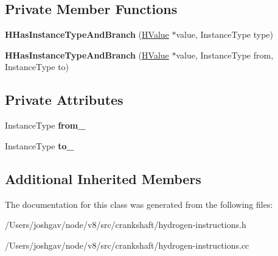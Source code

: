 \subsection*{Private Member Functions}
\begin{DoxyCompactItemize}
\item 
{\bfseries H\+Has\+Instance\+Type\+And\+Branch} (\hyperlink{classv8_1_1internal_1_1_h_value}{H\+Value} $\ast$value, Instance\+Type type)\hypertarget{classv8_1_1internal_1_1_h_has_instance_type_and_branch_a60d3746138690be31f950fab2bf1f64b}{}\label{classv8_1_1internal_1_1_h_has_instance_type_and_branch_a60d3746138690be31f950fab2bf1f64b}

\item 
{\bfseries H\+Has\+Instance\+Type\+And\+Branch} (\hyperlink{classv8_1_1internal_1_1_h_value}{H\+Value} $\ast$value, Instance\+Type from, Instance\+Type to)\hypertarget{classv8_1_1internal_1_1_h_has_instance_type_and_branch_ac3cea45668df2e068d4460d0b8ea06e3}{}\label{classv8_1_1internal_1_1_h_has_instance_type_and_branch_ac3cea45668df2e068d4460d0b8ea06e3}

\end{DoxyCompactItemize}
\subsection*{Private Attributes}
\begin{DoxyCompactItemize}
\item 
Instance\+Type {\bfseries from\+\_\+}\hypertarget{classv8_1_1internal_1_1_h_has_instance_type_and_branch_a59ad2505f8787baf2cfe14399e9dcf5e}{}\label{classv8_1_1internal_1_1_h_has_instance_type_and_branch_a59ad2505f8787baf2cfe14399e9dcf5e}

\item 
Instance\+Type {\bfseries to\+\_\+}\hypertarget{classv8_1_1internal_1_1_h_has_instance_type_and_branch_ab0ab33d8ce7ad71ee4689b3faa7d1b91}{}\label{classv8_1_1internal_1_1_h_has_instance_type_and_branch_ab0ab33d8ce7ad71ee4689b3faa7d1b91}

\end{DoxyCompactItemize}
\subsection*{Additional Inherited Members}


The documentation for this class was generated from the following files\+:\begin{DoxyCompactItemize}
\item 
/\+Users/joshgav/node/v8/src/crankshaft/hydrogen-\/instructions.\+h\item 
/\+Users/joshgav/node/v8/src/crankshaft/hydrogen-\/instructions.\+cc\end{DoxyCompactItemize}
